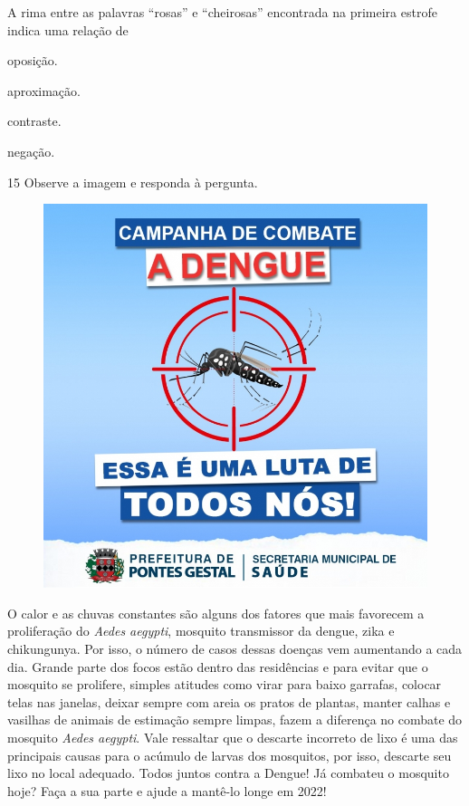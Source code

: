 \begin{myquote}
\begin{myescolha}
\begin{myquote}
\end{myquote}

A rima entre as palavras ``rosas'' e ``cheirosas'' encontrada na primeira
estrofe indica uma relação de

\begin{escolha}
  \item oposição.

  \item aproximação.

  \item contraste.

  \item negação.
\end{escolha}

\num{15} Observe a imagem e responda à pergunta.

\begin{myquote}
\begin{figure}
\includegraphics[width=.5\textwidth]{./imgQ4PORT/media/image3.jpeg}
\end{figure}

O calor e as chuvas constantes são alguns dos fatores que mais
favorecem a proliferação do \textit{Aedes aegypti}, mosquito transmissor da
dengue, zika e chikungunya. Por isso, o número de casos dessas doenças
vem aumentando a cada dia. Grande parte dos focos estão dentro das
residências e para evitar que o mosquito se prolifere, simples atitudes
como virar para baixo garrafas, colocar telas nas janelas, deixar sempre
com areia os pratos de plantas, manter calhas e vasilhas de animais de
estimação sempre limpas, fazem a diferença no combate do mosquito 
\textit{Aedes aegypti}. Vale ressaltar que o descarte incorreto de 
lixo é uma das principais causas para o acúmulo de larvas dos mosquitos,
por isso, descarte seu lixo no local adequado. Todos juntos contra a
Dengue! Já combateu o mosquito hoje? Faça a sua parte e ajude a mantê-lo
longe em 2022!


\end{myquote}
\end{myescolha}
\end{myquote}
